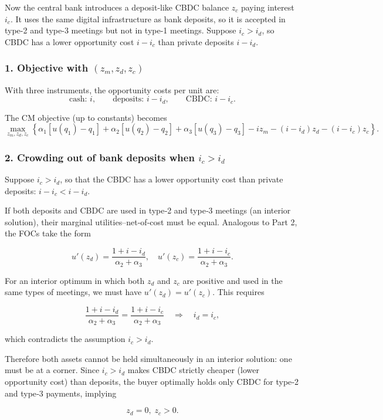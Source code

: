 \documentclass[11pt, a4paper]{article}
\begin{document}
Now the central bank introduces a deposit-like CBDC balance $z_c$ paying interest $i_c$.  
It uses the same digital infrastructure as bank deposits, so it is accepted in type-2 and type-3 meetings but not in type-1 meetings.  
Suppose $i_c > i_d$, so CBDC has a lower opportunity cost $i-i_c$ than private deposits $i-i_d$.

\subsubsection*{1. Objective with $(z_m,z_d,z_c)$}

With three instruments, the opportunity costs per unit are:
\[
\text{cash: } i, \qquad
\text{deposits: } i - i_d, \qquad
\text{CBDC: } i - i_c.
\]

The CM objective (up to constants) becomes
\[
\max_{z_m,z_d,z_c}
\left\{
\alpha_1[u(q_1)-q_1]
+ \alpha_2[u(q_2)-q_2]
+ \alpha_3[u(q_3)-q_3]
- i z_m - (i - i_d) z_d - (i - i_c) z_c
\right\}.
\]

\subsubsection*{2. Crowding out of bank deposits when $i_c>i_d$}

Suppose $i_c>i_d$, so that the CBDC has a lower opportunity cost than private deposits: $i-i_c<i-i_d$.

If both deposits and CBDC are used in type‑2 and type‑3 meetings (an interior solution), their marginal utilities–net‑of‑cost must be equal. Analogous to Part 2, the FOCs take the form

$$
u'(z_d)=\frac{1+i-i_d}{\alpha_2+\alpha_3},\quad
u'(z_c)=\frac{1+i-i_c}{\alpha_2+\alpha_3}.
$$

For an interior optimum in which both $z_d$ and $z_c$ are positive and used in the same types of meetings, we must have $u'(z_d)=u'(z_c)$. This requires

$$
\frac{1+i-i_d}{\alpha_2+\alpha_3}=\frac{1+i-i_c}{\alpha_2+\alpha_3}
\quad\Rightarrow\quad i_d=i_c,
$$

which contradicts the assumption $i_c>i_d$.

Therefore both assets cannot be held simultaneously in an interior solution: one must be at a corner. Since $i_c>i_d$ makes CBDC strictly cheaper (lower opportunity cost) than deposits, the buyer optimally holds only CBDC for type‑2 and type‑3 payments, implying

$$
z_d=0,\; z_c>0.
$$
\end{document}
